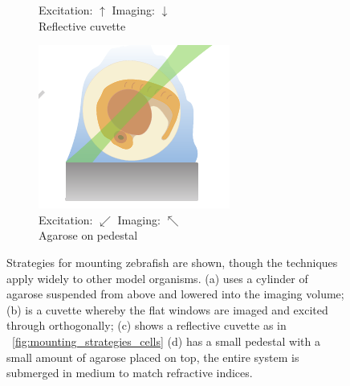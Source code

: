 \begin{figure}
\begin{subfigure}[b]{0.4\linewidth}
        \captionsetup{justification=centering}
         \caption{Excitation: \(\uparrow\) \quad  Imaging: \(\downarrow\) \\ Reflective cuvette}
    \end{subfigure}
    \begin{subfigure}[b]{0.4\linewidth}
             \centering
        \includegraphics{mounting_strategies_fish_cartoon/pedestal}
        \captionsetup{justification=centering}
         \caption{Excitation: \(\swarrow\) \quad Imaging: \(\nwarrow\) \\ Agarose on pedestal}
    \end{subfigure}
    \caption[Strategies for mounting \gls{zebrafish}]{Strategies for mounting \gls{zebrafish} are shown, though the techniques apply widely to other model organisms.
    (a) uses a cylinder of agarose suspended from above and lowered into the imaging volume;
    (b) is a cuvette whereby the flat windows are imaged and excited through orthogonally;
    (c) shows a reflective cuvette as in \figurename~\ref{fig:mounting_strategies_cells}
    (d) has a small pedestal with a small amount of agarose placed on top, the entire system is submerged in medium to match refractive indices.}\label{fig:mounting_strategies_fish_cartoon}
\end{figure}

